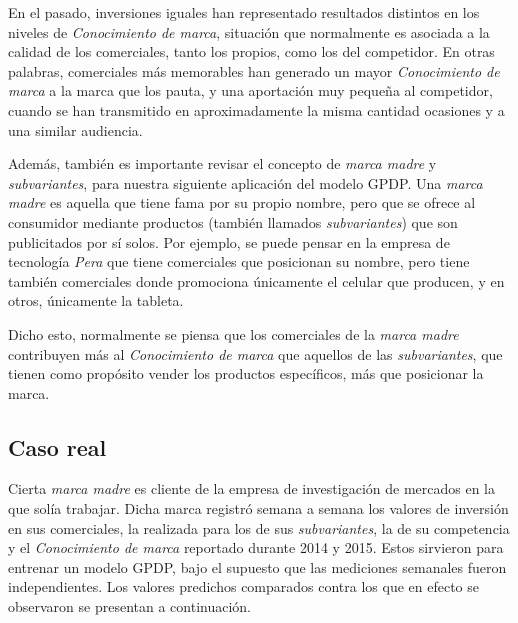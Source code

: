 En el pasado, inversiones iguales han representado resultados distintos en los niveles de \textit{Conocimiento de marca}, situaci\'on que normalmente es asociada a la calidad de los comerciales, tanto los propios, como los del competidor. En otras palabras, comerciales m\'as memorables han generado un mayor \textit{Conocimiento de marca} a la marca que los pauta, y una aportaci\'on muy pequeña al competidor, cuando se han transmitido en aproximadamente la misma cantidad ocasiones y a una similar audiencia.

Adem\'as, tambi\'en es importante revisar el concepto de \textit{marca madre} y \textit{subvariantes}, para nuestra siguiente aplicaci\'on del modelo GPDP. Una \textit{marca madre} es aquella que tiene fama por su propio nombre, pero que se ofrece al consumidor mediante productos (tambi\'en llamados \textit{subvariantes}) que son publicitados por s\'i solos. Por ejemplo, se puede pensar en la empresa de tecnolog\'ia \textit{Pera} que tiene comerciales que posicionan su nombre, pero tiene tambi\'en comerciales donde promociona \'unicamente el celular que producen, y en otros, \'unicamente la tableta.

Dicho esto, normalmente se piensa que los comerciales de la \textit{marca madre} contribuyen m\'as al \textit{Conocimiento de marca} que aquellos de las \textit{subvariantes}, que tienen como prop\'osito vender los productos espec\'ificos, m\'as que posicionar la marca.

\subsection{Caso real}

Cierta \textit{marca madre} es cliente de la empresa de investigaci\'on de mercados en la que sol\'ia trabajar. Dicha marca registr\'o semana a semana los valores de inversi\'on en sus comerciales, la realizada para los de sus \textit{subvariantes}, la de su competencia y el \textit{Conocimiento de marca} reportado durante 2014 y 2015. Estos sirvieron para entrenar un modelo GPDP, bajo el supuesto que las mediciones semanales fueron independientes. Los valores predichos comparados contra los que en efecto se observaron se presentan a continuaci\'on.

